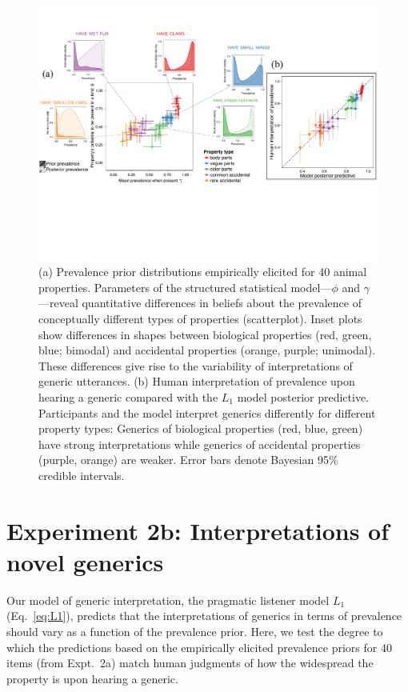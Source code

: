 \documentclass[12pt,letterpaper]{article}
\begin{document}
\begin{figure}
\centering
    \includegraphics[width=\columnwidth]{prevalence-implied-wPriors}
    \caption{(a) Prevalence prior distributions empirically elicited for 40 animal properties.
    Parameters of the structured statistical model---$\phi$ and $\gamma$---reveal quantitative differences in beliefs about the prevalence of conceptually different types of properties (scatterplot). 
    Inset plots show differences in shapes between biological properties (red, green, blue; bimodal) and accidental properties (orange, purple; unimodal).   
  These differences give rise to the variability of interpretations of generic utterances.
  (b)
  Human interpretation of prevalence upon hearing a generic compared with the $L_1$ model posterior predictive. 
    Participants and the model interpret generics differently for different property types: Generics of biological properties (red, blue, green) have  strong interpretations while generics of accidental properties (purple, orange) are weaker. 
      Error bars denote Bayesian 95\% credible intervals.
  }
  \label{fig:prior2}
\end{figure}




\section*{Experiment 2b: Interpretations of novel generics}

Our model of generic interpretation, the pragmatic listener model $L_1$ (Eq.~\ref{eq:L1}), predicts that the interpretations of generics in terms of prevalence should vary as a function of the prevalence prior.
Here, we test the degree to which the predictions based on the empirically elicited prevalence priors for 40 items (from Expt.~2a) match human judgments of how the widespread the property is upon hearing a generic.
\end{document}
